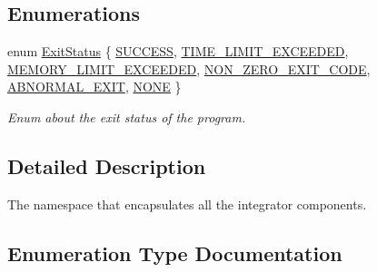 \subsection*{Enumerations}
\begin{DoxyCompactItemize}
\item 
enum \hyperlink{namespacetestcaser_1_1integrator_a68fcfdfd3f063954e9fd1a94f4b4f755}{Exit\+Status} \{ \newline
\hyperlink{namespacetestcaser_1_1integrator_a68fcfdfd3f063954e9fd1a94f4b4f755aabd86206819bb8e25fbb0961a8e38b20}{S\+U\+C\+C\+E\+SS}, 
\hyperlink{namespacetestcaser_1_1integrator_a68fcfdfd3f063954e9fd1a94f4b4f755a214e8c3d49482c1eaa0a66bab902d23f}{T\+I\+M\+E\+\_\+\+L\+I\+M\+I\+T\+\_\+\+E\+X\+C\+E\+E\+D\+ED}, 
\hyperlink{namespacetestcaser_1_1integrator_a68fcfdfd3f063954e9fd1a94f4b4f755a6269ea8263c3a49febe9c8a99e7b23fa}{M\+E\+M\+O\+R\+Y\+\_\+\+L\+I\+M\+I\+T\+\_\+\+E\+X\+C\+E\+E\+D\+ED}, 
\hyperlink{namespacetestcaser_1_1integrator_a68fcfdfd3f063954e9fd1a94f4b4f755a1d7d345211dfb2ecd7dee320e2e1ef26}{N\+O\+N\+\_\+\+Z\+E\+R\+O\+\_\+\+E\+X\+I\+T\+\_\+\+C\+O\+DE}, 
\newline
\hyperlink{namespacetestcaser_1_1integrator_a68fcfdfd3f063954e9fd1a94f4b4f755a2ce390b274b1bcf051de718e8fd8c9da}{A\+B\+N\+O\+R\+M\+A\+L\+\_\+\+E\+X\+IT}, 
\hyperlink{namespacetestcaser_1_1integrator_a68fcfdfd3f063954e9fd1a94f4b4f755a403ea6d636dc0acbe94a0cc506a0c852}{N\+O\+NE}
 \}\begin{DoxyCompactList}\small\item\em Enum about the exit status of the program. \end{DoxyCompactList}
\end{DoxyCompactItemize}


\subsection{Detailed Description}
The namespace that encapsulates all the integrator components. 

\subsection{Enumeration Type Documentation}
\mbox{\label{namespacetestcaser_1_1integrator_a68fcfdfd3f063954e9fd1a94f4b4f755}} 
